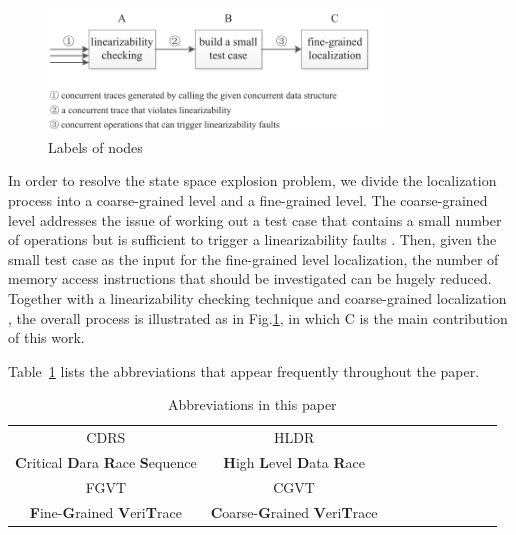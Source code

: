\documentclass[runningheads]{llncs}
\begin{document}
 
\begin{figure}[ht]
\centering
\includegraphics[width = 3.5in]{liucheng.pdf}
\caption{Labels of nodes}\label{fig:liucheng}
\end{figure}

In order to resolve the state space explosion problem, we divide the localization process into a coarse-grained level and a fine-grained level.
The coarse-grained level addresses the issue of working out a test case that contains a small number of operations but is sufficient to trigger a linearizability faults \cite{DBLP:conf/seke/ZhangWZ17}. 
Then, given the small test case as the input
for the fine-grained level localization, the number of memory access instructions that should be investigated 
can be hugely reduced.
Together with a linearizability checking technique \cite{DBLP:journals/concurrency/Lowe17} and coarse-grained localization \cite{DBLP:conf/seke/ZhangWZ17}, the overall process is illustrated as in Fig.\ref{fig:liucheng}, in which C is the main contribution of this work.

Table~\ref{tab:abbreviation} lists the abbreviations that appear frequently throughout the paper.





\begin{table}[]
\centering
\caption{Abbreviations in this paper}
\label{tab:abbreviation}
\begin{tabular}{c|c|c|c|c|c|c|c|c|c}
 CDRS & HLDR &  \\
 \textbf{C}ritical \textbf{D}ara \textbf{R}ace \textbf{S}equence& \textbf{H}igh \textbf{L}evel \textbf{D}ata \textbf{R}ace &  \\\hline
 FGVT & CGVT& \\
 \textbf{F}ine-\textbf{G}rained \textbf{V}eri\textbf{T}race &  \textbf{C}oarse-\textbf{G}rained \textbf{V}eri\textbf{T}race &
\end{tabular}
\end{table}
\end{document}
